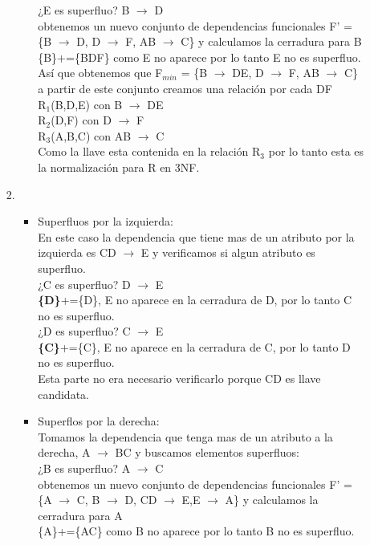 \documentclass{article}
\begin{document}
\begin{enumerate}
\begin{itemize}
\begin{enumerate}
\begin{itemize}
   			¿E es superfluo? B $\rightarrow$ D\\
   			obtenemos un nuevo conjunto de dependencias funcionales F' = \{B $\rightarrow$ D, D $\rightarrow$ F, AB $\rightarrow$ C\} y calculamos la cerradura para B\\
   			\{B\}+=\{BDF\} como E no aparece por lo tanto E no es superfluo.\\
   			
   			Así que obtenemos que F$_{min}$ = \{B $\rightarrow$ DE, D $\rightarrow$ F, AB $\rightarrow$ C\} a partir de este conjunto creamos una relación por cada DF\\
   			R$_1$(B,D,E) con B $\rightarrow$ DE\\
   			R$_2$(D,F) con  D $\rightarrow$ F\\
   			R$_3$(A,B,C) con AB $\rightarrow$ C\\
   			
   			Como la llave esta contenida en la relación R$_3$ por lo tanto esta es la normalización para R en 3NF.\\
   			\end{itemize}
   			
   		\item \begin{itemize}	
   			\item Superfluos por la izquierda:\\
   			En este caso la dependencia que tiene mas de un atributo por la izquierda es CD $\rightarrow$ E y verificamos si algun atributo es superfluo.\\
   			¿C es superfluo? D $\rightarrow$ E\\
   			\textbf{\{D\}}+=\{D\}, E no aparece en la cerradura de D, por lo tanto C no es superfluo.\\
   			¿D es superfluo? C $\rightarrow$ E\\
   			\textbf{\{C\}}+=\{C\}, E no aparece en la cerradura de C, por lo tanto D no es superfluo.\\
   			Esta parte no era necesario verificarlo porque CD es llave candidata.
   			
   			\item Superflos por la derecha:\\
   			Tomamos la dependencia que tenga mas de un atributo a la derecha, A $\rightarrow$ BC y buscamos elementos superfluos:\\
   			¿B es superfluo? A $\rightarrow$ C \\
   			obtenemos un nuevo conjunto de dependencias funcionales F' = \{A $\rightarrow$ C, B $\rightarrow$ D, CD $\rightarrow$ E,E $\rightarrow$ A\} y calculamos la cerradura para A\\
   			\{A\}+=\{AC\} como B no aparece por lo tanto B no es superfluo.\\
   			

\end{itemize}
\end{enumerate}
\end{itemize}
\end{enumerate}
\end{document}
